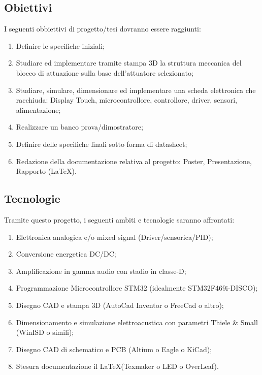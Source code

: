 \documentclass[lettersize,journal,onecolumn]{IEEEtran}
\begin{document}
\subsection{Obiettivi}
\noindent I seguenti obbiettivi di progetto/tesi dovranno essere raggiunti:
\begin{enumerate}{}{}
\item{Definire le specifiche iniziali;}
\item{Studiare ed implementare tramite stampa 3D la struttura meccanica del blocco di attuazione sulla base dell'attuatore selezionato;}
\item{Studiare, simulare, dimensionare ed implementare una scheda elettronica che racchiuda: Display Touch, microcontrollore, controllore, driver, sensori, alimentazione;}
\item{Realizzare un banco prova/dimostratore;}
\item{Definire delle specifiche finali sotto forma di datasheet;}
\item{Redazione della documentazione relativa al progetto: Poster, Presentazione, Rapporto (\LaTeX).}
\end{enumerate}
\subsection{Tecnologie}
\noindent Tramite questo progetto, i seguenti ambiti e tecnologie saranno affrontati:
\begin{enumerate}{}{}
\item Elettronica analogica e/o mixed signal (Driver/sensorica/PID);
\item Conversione energetica DC/DC;
\item Amplificazione in gamma audio con stadio in classe-D;
\item Programmazione Microcontrollore STM32 (idealmente STM32F469i-DISCO);
\item Disegno CAD e stampa 3D (AutoCad Inventor o FreeCad o altro);
\item Dimensionamento e simulazione elettroacustica con parametri Thiele \& Small (WinISD o simili);
\item Disegno CAD di schematico e PCB (Altium o Eagle o KiCad);
\item Stesura documentazione il \LaTeX (Texmaker o LED o OverLeaf).
\end{enumerate}
\end{document}
